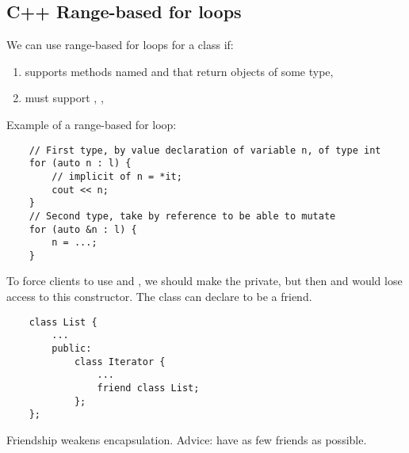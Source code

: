 \subsection{C++ Range-based for loops}
We can use range-based for loops for a class  if:
\begin{enumerate}[(1)]
    \item {} supports methods named  and 
    that return objects of some type, 
    \item {} must support \code{!=}, \code{++}, \code{*}
\end{enumerate}
Example of a range-based for loop:
\begin{lstlisting}
    // First type, by value declaration of variable n, of type int
    for (auto n : l) {
        // implicit of n = *it;
        cout << n;
    }
    // Second type, take by reference to be able to mutate
    for (auto &n : l) {
        n = ...;
    }
\end{lstlisting}

To force clients to use  and , we should make the
 private, but then  and 
would lose access to this constructor. The  class can declare
 to be a friend.
\begin{lstlisting}
    class List {
        ...
        public:
            class Iterator {
                ...
                friend class List;
            };
    };
\end{lstlisting}
Friendship weakens encapsulation. Advice: have as few friends as possible.
